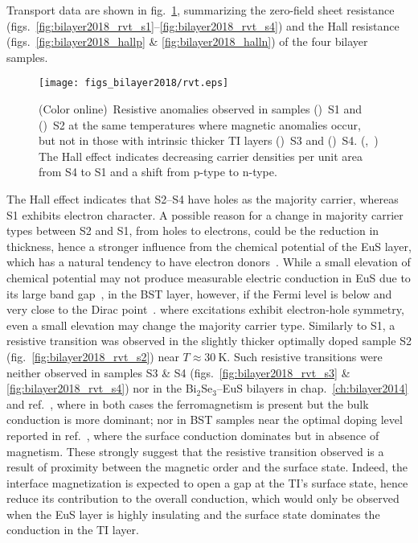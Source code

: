 Transport data are shown in fig.~\ref{fig:bilayer2018_rvt}, summarizing the zero-field sheet resistance (figs.~\ref{fig:bilayer2018_rvt_s1}--\ref{fig:bilayer2018_rvt_s4}) and the Hall resistance (figs.~\ref{fig:bilayer2018_hallp} \& \ref{fig:bilayer2018_halln}) of the four bilayer samples. %
\begin{figure}[ht]%
    \centering%
    \texttt{[image: figs\_bilayer2018/rvt.eps]}%
    \subfloat{\label{fig:bilayer2018_rvt_s1}}%
    \subfloat{\label{fig:bilayer2018_rvt_s2}}%
    \subfloat{\label{fig:bilayer2018_rvt_s3}}%
    \subfloat{\label{fig:bilayer2018_rvt_s4}}%
    \subfloat{\label{fig:bilayer2018_hallp}}%
    \subfloat{\label{fig:bilayer2018_halln}}%
    \caption[Temperature dependence of resistance and Hall effects in (Bi$_{x}$Sb$_{1-x}$)$_2$Te$_3$--EuS bilayer samples]{\label{fig:bilayer2018_rvt}(Color online)~Resistive anomalies observed in samples (\protect{})~S1 and (\protect{})~S2 at the same temperatures where magnetic anomalies occur, but not in those with intrinsic thicker TI layers (\protect{})~S3 and (\protect{})~S4. (\protect{},~\protect{}) The Hall effect indicates decreasing carrier densities per unit area from S4 to S1 and a shift from p-type to n-type.}%
\end{figure}%
The Hall effect indicates that S2--S4 have holes as the majority carrier, whereas S1 exhibits electron character. A possible reason for a change in majority carrier types between S2 and S1, from holes to electrons, could be the reduction in thickness, hence a stronger influence from the chemical potential of the EuS layer, which has a natural tendency to have electron donors~\cite{EuS_ntype}. While a small elevation of chemical potential may not produce measurable electric conduction in EuS due to its large band gap~\cite{EuS_band_th1, EuS_band_th2}, in the BST layer, however, if the Fermi level is below and very close to the Dirac point~\cite{ZhangJS2011}. where excitations exhibit electron-hole symmetry, even a small elevation may change the majority carrier type. Similarly to S1, a resistive transition was observed in the slightly thicker optimally doped sample S2 (fig.~\ref{fig:bilayer2018_rvt_s2}) near $T\approx30~\mathrm{K}$. Such resistive transitions were neither observed in samples S3 \& S4 (figs.~\ref{fig:bilayer2018_rvt_s3} \& \ref{fig:bilayer2018_rvt_s4}) nor in the Bi$_2$Se$_3$--EuS bilayers in chap.~\ref{ch:bilayer2014} and ref.~\cite{bilayer2014}, where in both cases the ferromagnetism is present but the bulk conduction is more dominant; nor in BST samples near the optimal doping level reported in ref.~\cite{ZhangJS2011}, where the surface conduction dominates but in absence of magnetism. These strongly suggest that the resistive transition observed is a result of proximity between the magnetic order and the surface state. Indeed, the interface magnetization is expected to open a gap at the TI's surface state, hence reduce its contribution to the overall conduction, which would only be observed when the EuS layer is highly insulating and the surface state dominates the conduction in the TI layer.

